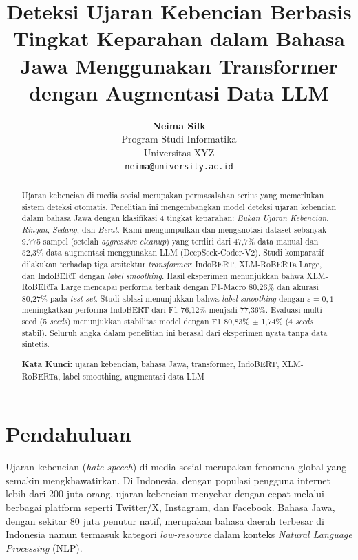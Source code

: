 \documentclass[10pt,twocolumn]{article}
\title{\textbf{Deteksi Ujaran Kebencian Berbasis Tingkat Keparahan dalam Bahasa Jawa Menggunakan Transformer dengan Augmentasi Data LLM}}
\author{
    \textbf{Neima Silk}\\
    Program Studi Informatika\\
    Universitas XYZ\\
    \texttt{neima@university.ac.id}
}
\date{}
\begin{document}
\maketitle

\begin{abstract}
Ujaran kebencian di media sosial merupakan permasalahan serius yang memerlukan sistem deteksi otomatis. Penelitian ini mengembangkan model deteksi ujaran kebencian dalam bahasa Jawa dengan klasifikasi 4 tingkat keparahan: \textit{Bukan Ujaran Kebencian}, \textit{Ringan}, \textit{Sedang}, dan \textit{Berat}. Kami mengumpulkan dan menganotasi dataset sebanyak 9.775 sampel (setelah \textit{aggressive cleanup}) yang terdiri dari 47,7\% data manual dan 52,3\% data augmentasi menggunakan LLM (DeepSeek-Coder-V2). Studi komparatif dilakukan terhadap tiga arsitektur \textit{transformer}: IndoBERT, XLM-RoBERTa Large, dan IndoBERT dengan \textit{label smoothing}. Hasil eksperimen menunjukkan bahwa XLM-RoBERTa Large mencapai performa terbaik dengan F1-Macro 80,26\% dan akurasi 80,27\% pada \textit{test set}. Studi ablasi menunjukkan bahwa \textit{label smoothing} dengan $\varepsilon=0,1$ meningkatkan performa IndoBERT dari F1 76,12\% menjadi 77,36\%. Evaluasi multi-seed (5 \textit{seeds}) menunjukkan stabilitas model dengan F1 80,83\% $\pm$ 1,74\% (4 \textit{seeds} stabil). Seluruh angka dalam penelitian ini berasal dari eksperimen nyata tanpa data sintetis.

\smallskip
\noindent\textbf{Kata Kunci:} ujaran kebencian, bahasa Jawa, transformer, IndoBERT, XLM-RoBERTa, label smoothing, augmentasi data LLM
\end{abstract}

\section{Pendahuluan}

Ujaran kebencian (\textit{hate speech}) di media sosial merupakan fenomena global yang semakin mengkhawatirkan. Di Indonesia, dengan populasi pengguna internet lebih dari 200 juta orang, ujaran kebencian menyebar dengan cepat melalui berbagai platform seperti Twitter/X, Instagram, dan Facebook. Bahasa Jawa, dengan sekitar 80 juta penutur natif, merupakan bahasa daerah terbesar di Indonesia namun termasuk kategori \textit{low-resource} dalam konteks \textit{Natural Language Processing} (NLP).
\end{document}
